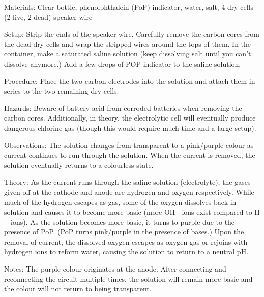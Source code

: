\begin{multicols}{2}
\begin{description*}
\item[Materials:]{Clear bottle, phenolphthalein (PoP) indicator, water, salt, 4 dry cells (2 live, 2 dead) speaker wire}
\item[Setup:]{Strip the ends of the speaker wire. Carefully remove the carbon cores from the dead dry cells and wrap the stripped wires around the tops of them. In the container, make a saturated saline solution (keep dissolving salt until you can't dissolve anymore.) Add a few drops of POP indicator to the saline solution.}
\item[Procedure:]{Place the two carbon electrodes into the solution and attach them in series to the two remaining dry cells.}
\item[Hazards:]{Beware of battery acid from corroded batteries when removing the carbon cores. Additionally, in theory, the electrolytic cell will eventually produce dangerous chlorine gas (though this would require much time and a large setup).}
\item[Observations:]{The solution changes from transparent to a pink/purple colour as current continues to run through the solution. When the current is removed, the solution eventually returns to a colourless state.}
\item[Theory:]{As the current runs through the saline solution (electrolyte), the gases given off at the cathode and anode are hydrogen and oxygen respectively. While much of the hydrogen escapes as gas, some of the oxygen dissolves back in solution and causes it to become more basic (more OH$^-$ ions exist compared to H$^+$ ions). As the solution becomes more basic, it turns to purple due to the presence of PoP. (PoP turns pink/purple in the presence of bases.) Upon the removal of current, the dissolved oxygen escapes as oxygen gas or rejoins with hydrogen ions to reform water, causing the solution to return to a neutral pH.}
\item[Notes:]{The purple colour originates at the anode. After connecting and reconnecting the circuit multiple times, the solution will remain more basic and the colour will not return to being transparent.}
\end{description*}

\vfill
\columnbreak



\end{multicols}
